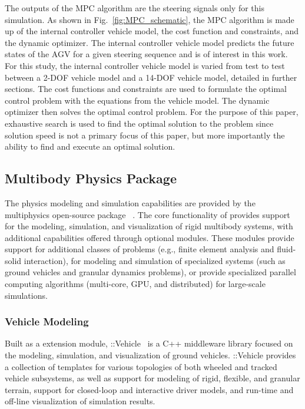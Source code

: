 \documentclass[12pt,twocolumn]{article}
\newcommand{\CHRONO}{{\sffamily{{Chrono}}}}
\newcommand{\ChronoVehicle}{{\sffamily{Chrono}}::Vehicle}
\begin{document}
The outputs of the MPC algorithm are the steering signals only for this simulation. As shown in Fig.~\ref{fig:MPC_schematic}, the MPC algorithm is made up of the internal controller vehicle model, the cost function and constraints, and the dynamic optimizer. The internal controller vehicle model predicts the future states of the AGV for a given steering sequence and is of interest in this work. For this study, the internal controller vehicle model is varied from test to test between a 2-DOF vehicle model and a 14-DOF vehicle model, detailed in further sections. The cost functions and constraints are used to formulate the optimal control problem with the equations from the vehicle model. The dynamic optimizer then solves the optimal control problem. For the purpose of this paper, exhaustive search is used to find the optimal solution to the problem since solution speed is not a primary focus of this paper, but more importantly the ability to find and execute an optimal solution.


\subsection{{\CHRONO} Multibody Physics Package}\label{ss:Chrono}

The physics modeling and simulation capabilities are provided by the multiphysics open-source package {\CHRONO}~\cite{Chrono2016}. The core functionality of {\CHRONO} provides support for the modeling, simulation, and visualization of rigid multibody systems, with additional capabilities offered through optional modules. These modules provide support for additional classes of problems (e.g., finite element analysis and fluid-solid interaction), for modeling and simulation of specialized systems (such as ground vehicles and granular dynamics problems), or provide specialized parallel computing algorithms (multi-core, GPU, and distributed) for large-scale simulations.


\subsubsection{Vehicle Modeling}\label{sss:Chrono_Vehicle}
	
Built as a {\CHRONO} extension module, {\ChronoVehicle}~\cite{ChronoVehicle_TR} is a C++ middleware library focused on the modeling, simulation, and visualization of ground vehicles.
%
{\ChronoVehicle} provides a collection of templates for various topologies of both wheeled and tracked vehicle subsystems, as well as support for modeling of rigid, flexible, and granular terrain, support for closed-loop and interactive driver models, and run-time and off-line visualization of simulation results.
\end{document}
